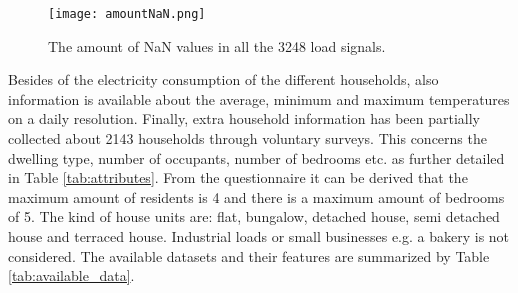  \begin{figure}[h!]
 	\centering
 	\texttt{[image: amountNaN.png]}
 	\caption{The amount of NaN values in all the 3248 load signals.}
 	\label{fig:amountNaN}
 \end{figure}

Besides of the electricity consumption of the different households, also information is available about the average, minimum and maximum temperatures on a daily resolution. Finally, extra household information has been partially collected about 2143 households through voluntary surveys. This concerns the dwelling type, number of occupants, number of bedrooms etc. as further detailed in Table \ref{tab:attributes}. From the questionnaire it can be derived that the maximum amount of residents is 4 and there is a maximum amount of bedrooms of 5. The kind of house units are: flat, bungalow, detached house, semi detached house and terraced house. Industrial loads or small businesses e.g. a bakery is not considered. The available datasets and their features are summarized by Table \ref{tab:available_data}.\\


%
%
%

